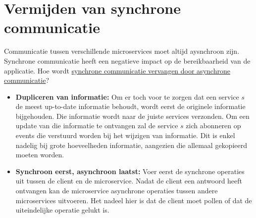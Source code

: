 	\section{Vermijden van synchrone communicatie}
	Communicatie tussen verschillende microservices moet altijd aysnchroon zijn. Synchrone communicatie heeft een negatieve impact op de bereikbaarheid van de applicatie. Hoe wordt \uline{synchrone communicatie vervangen door asynchrone communicatie}?
	\begin{itemize}
		\item[\info] \textbf{Dupliceren van informatie:} Om er toch voor te zorgen dat een service $s$ de meest up-to-date informatie behoudt, wordt eerst de originele informatie bijgehouden. Die informatie wordt naar de juiste services verzonden. Om een update van die informatie te ontvangen zal de service $s$ zich abonneren op events die verstuurd worden bij het wijzigen van informatie. Dit is enkel nadelig bij grote hoeveelheden informatie, aangezien die allemaal gekopieerd moeten worden.
		\item[\info] \textbf{Synchroon eerst, asynchroon laatst:} Voer eerst de synchrone operaties uit tussen de client en de microservice. Nadat de client een antwoord heeft ontvangen kan de microservice asynchrone operaties tussen andere microservices uitvoeren. Het nadeel hier is dat de client moet pollen of dat de uiteindelijke operatie gelukt is. 
	\end{itemize}



